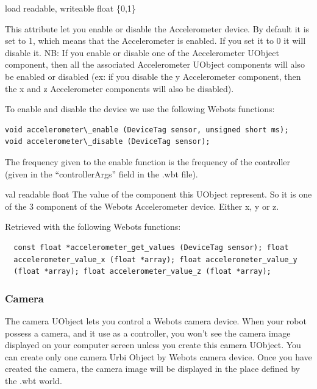 \noindent
\begin{itemize}
\begin{attribute}{load}
  {readable, writeable}
  {float}
  {\{0,1\}}

    This attribute let you enable or disable the
    Accelerometer device.  By default it is set to 1, which means that
    the Accelerometer is enabled. If you set it to 0 it will disable
    it. NB: If you enable or disable one of the Accelerometer UObject
    component, then all the associated Accelerometer UObject components
    will also be enabled or disabled (ex: if you disable the y
    Accelerometer component, then the x and z Accelerometer components
    will also be disabled).


    To enable and disable the device we use the following Webots
    functions:


\begin{lstlisting}
void accelerometer\_enable (DeviceTag sensor, unsigned short ms);
void accelerometer\_disable (DeviceTag sensor);
\end{lstlisting}

    The frequency given to the enable function is the frequency of the
    \urbi controller (given in the ``controllerArgs'' field in the .wbt
    file).
\end{attribute}

\begin{attribute}{val}
  {readable}
  {float}
  {}
  The value of the component this UObject represent. So
  it is one of the 3 component of the Webots Accelerometer
  device. Either x, y or z.


  Retrieved with the following Webots functions:


\begin{lstlisting}
  const float *accelerometer_get_values (DeviceTag sensor); float
  accelerometer_value_x (float *array); float accelerometer_value_y
  (float *array); float accelerometer_value_z (float *array);
\end{lstlisting}
\end{attribute}

\end{itemize}

\subsubsection{Camera}
\label{webots.uobjects.robotdevices.camera}%

   The camera UObject lets you control a Webots camera device. When your robot
  possess a camera, and it use
  \urbi as a controller, you won't see the camera image displayed on your computer
  screen unless you create this camera UObject. You can create only one
  camera Urbi Object by Webots camera device. Once you have created the camera,
  the camera image will be displayed in the place defined by the .wbt world.


